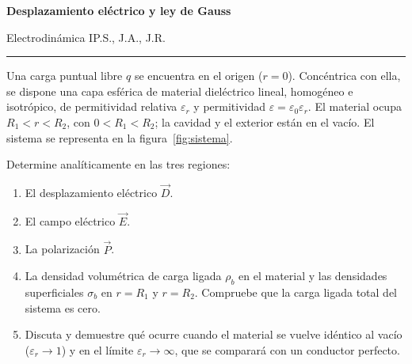 \documentclass[11pt]{article}
\newcommand{\encabezado}[1]{%
  {\Large\bfseries #1\par}\vspace{3pt}
  {\normalsize Electrodinámica I\hfill P.S., J.A., J.R.\par}
  \vspace{6pt}\hrule\vspace{8pt}}
\begin{document}
\encabezado{Desplazamiento eléctrico y ley de Gauss}


Una carga puntual libre $q$ se encuentra en el origen ($r=0$). Concéntrica
con ella, se dispone una capa esférica de material dieléctrico lineal,
homogéneo e isotrópico, de permitividad relativa $\varepsilon_r$ y
permitividad $\varepsilon=\varepsilon_0\varepsilon_r$. El material ocupa
$R_1<r<R_2$, con $0<R_1<R_2$; la cavidad y el exterior están en el vacío.
El sistema se representa en la figura~\ref{fig:sistema}.

Determine analíticamente en las tres regiones:
\begin{enumerate}
  \item El desplazamiento eléctrico $\vec D$.
  \item El campo eléctrico $\vec E$.
  \item La polarización $\vec P$.
  \item La densidad volumétrica de carga ligada $\rho_b$ en el material
  y las densidades superficiales $\sigma_b$ en $r=R_1$ y $r=R_2$.
  Compruebe que la carga ligada total del sistema es cero.
  \item Discuta y demuestre qué ocurre cuando el material se vuelve
  idéntico al vacío ($\varepsilon_r\to1$) y en el límite
  $\varepsilon_r\to\infty$, que se comparará con un conductor perfecto.
\end{enumerate}
\end{document}
